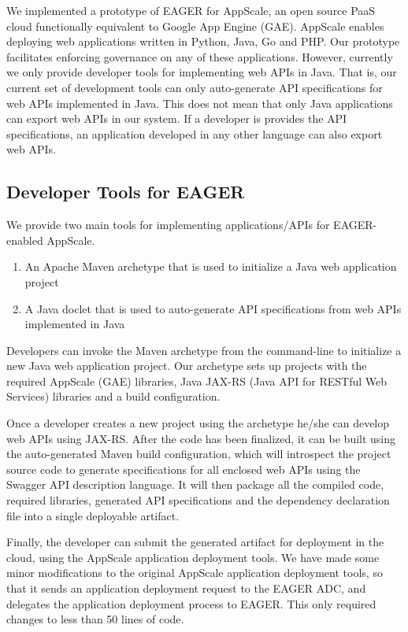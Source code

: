 We implemented a prototype of EAGER for AppScale, an open source PaaS cloud functionally equivalent to Google App Engine (GAE). 
AppScale enables deploying web applications written in Python, Java, Go and PHP. Our prototype facilitates enforcing governance on
any of these applications. However, currently we only provide developer tools for implementing web APIs in Java. That is, our current set of development
tools can only auto-generate API specifications for web APIs implemented in Java. This does not mean that only Java applications can export web
APIs in our system. If a developer is provides the API specifications, an application developed in any other language can also export web APIs.

\subsection{Developer Tools for EAGER}
We provide two main tools for implementing applications/APIs for EAGER-enabled AppScale.
\begin{enumerate}
\item An Apache Maven archetype that is used to initialize a Java web application project
\item A Java doclet that is used to auto-generate API specifications from web APIs implemented in Java
\end{enumerate}

Developers can invoke the Maven archetype from the command-line to initialize a new Java web application project. Our
archetype sets up projects with the required AppScale (GAE) libraries, Java JAX-RS (Java API for RESTful Web Services) libraries 
and a build configuration.

Once a developer creates a new project using the archetype he/she can develop web APIs using JAX-RS. After the code has 
been finalized, it can be built using the auto-generated Maven build configuration, which will introspect the project source code to
generate specifications for all enclosed web APIs using the Swagger API description language. It will
then package all the compiled code, required libraries, generated API specifications and the dependency declaration file into a single deployable
artifact.

Finally, the developer can submit the generated artifact for deployment in the cloud, using the AppScale application deployment tools. We have
made some minor modifications to the original AppScale application deployment tools, so that it sends an application deployment request to
the EAGER ADC, and delegates the application deployment process to EAGER. This only required changes to less than 50 lines of code.

